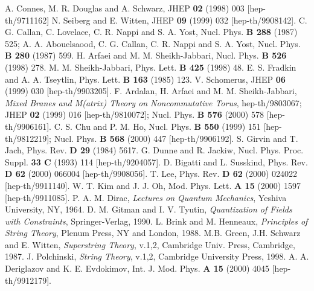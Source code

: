 \documentclass[a4paper]{article}
\begin{document}
%
%
\begin{thebibliography}{nn}
\bibitem{} A. Connes, M. R. Douglas and A. Schwarz, 
JHEP {\bf 02} (1998) 003 [hep-th/9711162]
\bibitem{} N. Seiberg and E. Witten,
JHEP {\bf 09} (1999) 032 [hep-th/9908142].
\bibitem{} C. G. Callan, C. Lovelace, C. R. Nappi and S. A. Yost,
Nucl. Phys. {\bf B 288} (1987) 525; A. A. Abouelsaood,  
C. G. Callan, C. R. Nappi and S. A. Yost, 
Nucl. Phys. {\bf B 280} (1987) 599.
\bibitem{} H. Arfaei and M. M. Sheikh-Jabbari,
Nucl. Phys. {\bf B 526} (1998) 278. 
\bibitem{} M. M. Sheikh-Jabbari,  Phys. Lett. {\bf B 425} (1998) 48.
\bibitem{} E. S. Fradkin and A. A. Tseytlin, Phys. Lett. {\bf B 163} 
(1985) 123.
\bibitem{} V. Schomerus, JHEP {\bf 06} (1999) 030 [hep-th/9903205].
\bibitem{} F. Ardalan, H. Arfaei and M. M. Sheikh-Jabbari, 
{\em Mixed Branes and M(atrix) Theory on Noncommutative Torus}, 
hep-th/9803067; JHEP {\bf 02} (1999) 016 [hep-th/9810072]; 
Nucl. Phys. {\bf B 576} (2000) 578 [hep-th/9906161].
\bibitem{} C. S. Chu and P. M. Ho, 
Nucl. Phys. {\bf B 550} (1999) 151 [hep-th/9812219]; 
Nucl. Phys. {\bf B 568} (2000) 447 [hep-th/9906192].
\bibitem{} S. Girvin and T. Jach, Phys. Rev. {\bf D 29} (1984) 5617. 
\bibitem{} G. Dunne and R. Jackiw, Nucl. Phys. Proc. Suppl. 
{\bf 33 C} (1993) 114 [hep-th/9204057]. 
\bibitem{} D. Bigatti and L. Susskind, Phys. Rev. {\bf D 62} (2000)  
066004 [hep-th/9908056].
\bibitem{} T. Lee, Phys. Rev. {\bf D 62} (2000) 024022 [hep-th/9911140].
\bibitem{} W. T. Kim and J. J. Oh, Mod. Phys. Lett. {\bf A 15} (2000) 
1597 [hep-th/9911085].
\bibitem{} P. A. M. Dirac, {\em Lectures on Quantum Mechanics}, 
Yeshiva University, NY, 1964.
\bibitem{} D. M. Gitman and I. V. Tyutin, {\em Quantization of Fields
with Constraints}, Springer-Verlag, 1990.
\bibitem{} L. Brink and M. Henneaux, {\it{Principles of String Theory}},
Plenum Press, NY and London, 1988.
\bibitem{} M.B. Green, J.H. Schwarz and E. Witten,
{\it{Superstring Theory}}, v.1,2, Cambridge Univ. Press, Cambridge, 1987.
\bibitem{} J. Polchinski, {\it{String Theory}}, v.1,2,
Cambridge University Press, 1998.
\bibitem{} A. A. Deriglazov and K. E. Evdokimov, Int. J. Mod. Phys. 
{\bf A 15} (2000) 4045 [hep-th/9912179].
\end{thebibliography}
\end{document}
